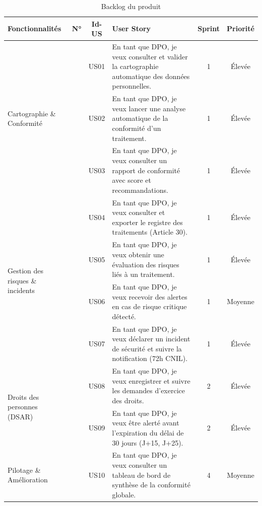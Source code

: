 \documentclass[12pt,a4paper]{report}
\begin{document}
\begin{table}[H]
\centering
\caption{Backlog du produit}
\label{tab:backlog}
\renewcommand{\arraystretch}{1.4}
\begin{tabular}{|p{2.5cm}|c|c|p{6cm}|c|c|}
\hline
\textbf{Fonctionnalités} & \textbf{N°} & \textbf{Id-US} & \textbf{User Story} & \textbf{Sprint} & \textbf{Priorité} \\
\hline

\multirow{3}{2.5cm}{\centering Cartographie \& Conformité}
 & \multirow{3}{*}{\centering 1}
 & US01 & En tant que DPO, je veux consulter et valider la cartographie automatique des données personnelles. & 1 & Élevée \\
\cline{3-6}
 & & US02 & En tant que DPO, je veux lancer une analyse automatique de la conformité d'un traitement. & 1 & Élevée \\
\cline{3-6}
 & & US03 & En tant que DPO, je veux consulter un rapport de conformité avec score et recommandations. & 1 & Élevée \\
\hline

\multirow{4}{2.5cm}{\centering Gestion des risques \& incidents}
 & \multirow{4}{*}{\centering 2}
 & US04 & En tant que DPO, je veux consulter et exporter le registre des traitements (Article 30). & 1 & Élevée \\
\cline{3-6}
 & & US05 & En tant que DPO, je veux obtenir une évaluation des risques liés à un traitement. & 1 & Élevée \\
\cline{3-6}
 & & US06 & En tant que DPO, je veux recevoir des alertes en cas de risque critique détecté. & 1 & Moyenne \\
\cline{3-6}
 & & US07 & En tant que DPO, je veux déclarer un incident de sécurité et suivre la notification (72h CNIL). & 1 & Élevée \\
\hline

\multirow{2}{2.5cm}{\centering Droits des personnes (DSAR)}
 & \multirow{2}{*}{\centering 3}
 & US08 & En tant que DPO, je veux enregistrer et suivre les demandes d'exercice des droits. & 2 & Élevée \\
\cline{3-6}
 & & US09 & En tant que DPO, je veux être alerté avant l'expiration du délai de 30 jours (J+15, J+25). & 2 & Élevée \\
\hline

\multirow{1}{2.5cm}{\centering Pilotage \& Amélioration}
 & \multirow{1}{*}{\centering 4}
 & US10 & En tant que DPO, je veux consulter un tableau de bord de synthèse de la conformité globale. & 4 & Moyenne \\
\hline

\end{tabular}
\end{table}
\end{document}
